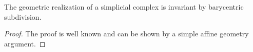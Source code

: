 \begin{theorem}[$|K|=|K^{(1)}|$]
    The geometric realization of a simplicial complex is invariant by barycentric subdivision.
\end{theorem}
\begin{proof}
    The proof is well known and can be shown by a simple affine geometry argument.
\end{proof}



